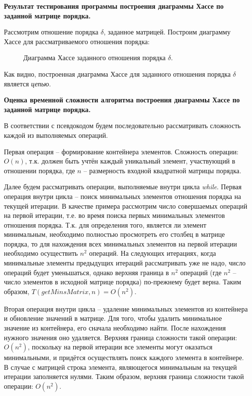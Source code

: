 \documentclass[spec, och, otchet, hidelinks]{SCWorks}
\begin{document}
\newpage

\par \textbf{Результат тестирования программы построения диаграммы Хассе по
  заданной матрице порядка.}

\par Рассмотрим отношение порядка $\delta$, заданное матрицей. Построим
диаграмму Хассе для рассматриваемого отношения порядка:

\begin{figure}[h]
  \caption{Диаграмма Хассе заданного отношения порядка $\delta$.}
\end{figure}

\par Как видно, построенная диаграмма Хассе для заданного отношения порядка $\delta$
является \textit{цепью}.
\\
\par \textbf{Оценка временной сложности алгоритма построения диаграммы Хассе по
  заданной матрице порядка.}

\par В соответствии с псевдокодом будем последовательно рассматривать сложность
каждой из выполняемых операций.

\par Первая операция -- формирование контейнера
элементов. Сложность операции: $O(n)$, т.к. должен быть учтён каждый уникальный
элемент, участвующий в отношении порядка, где $n$ -- размерность входной
квадратной матрицы порядка. 

\par Далее будем рассматривать операции, выполняемые внутри цикла
\textit{while}. Первая операция внутри цикла -- поиск минимальных элементов
отношения порядка на текущей итерации. В качестве примера рассмотрим число
совершаемых операций на первой итерации, т.е. во время поиска первых минимальных
элементов отношения порядка. Т.к. для определения того, является ли
элемент минимальным, необходимо полностью просмотреть его столбец в матрице
порядка, то для нахождения всех минимальных элементов на
первой итерации необходимо осуществить $n^2$ операций. На следующих итерациях,
когда минимальные элементы предыдущих итераций рассматривать уже не надо, число
операций будет уменьшаться, однако верхняя граница в $n^2$ операций (где $n^2$
-- число элементов в исходной матрице порядка) по-прежнему будет верна. Таким
образом, $T(getMinsMatrix, n) = O(n^2)$.

\par Вторая операция внутри цикла -- удаление минимальных элементов из
контейнера и обновление значений в матрице. Для того, чтобы удалить минимальное
значение из контейнера, его сначала необходимо найти. После нахождения нужного
значения оно удаляется. Верхняя граница сложности такой операции: $O(n^2)$,
поскольку на первой итерации все элементы могут оказаться минимальными, и
придётся осуществлять поиск каждого элемента в контейнере. В случае с матрицей
строка элемента, являющегося минимальным на текущей итерации заполняется нулями.
Таким образом, верхняя граница сложности такой операции: $O(n^2)$.
\end{document}
